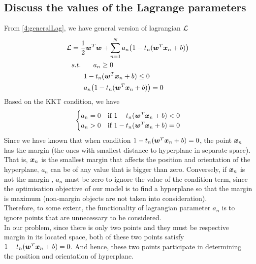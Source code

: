 \documentclass[11pt,a4paper]{article}
\newcommand{\htab}{\hspace*{0.63cm}}
\begin{document}
\subsection{Discuss the values of the Lagrange parameters}
\htab From \eqref{4:generalLag}, we have general version of lagrangian $\mathcal{L}$
\begin{align}
    \lagg &= \frac{1}{2} \wt \w + \sumn a_{n} \big( 1 - t_{n} (\wt \xn + b) \big) \nonumber\\
          & s.t.\htab  a_{n} \geq 0 \nonumber \\
          & \htab 1 - t_{n} (\wt \xn + b) \leq 0 \\
          & \htab a_{n} \big( \condition \big) = 0 \nonumber
    \end{align}
\htab Based on the KKT condition, we have 
\begin{align}
      \begin{cases} 
         a_{n} = 0 & \text{if }  1 - t_{n} (\boldsymbol{w}^{T} \boldsymbol{x}_{n} + b) < 0 \\
         a_{n} > 0 & \text{if }  1 - t_{n} (\boldsymbol{w}^{T} \boldsymbol{x}_{n} + b) = 0 
        \end{cases}
\end{align}
\htab Since we have known that when condition $1 - t_{n} (\boldsymbol{w}^{T} \boldsymbol{x}_{n} + b) = 0$, the point $\boldsymbol{x}_{n}$ has the margin (the ones 
with smallest distance to hyperplane in separate space).
That is, $\boldsymbol{x}_{n}$ is the smallest margin that affects the position and orientation of the hyperplane, 
$a_{n}$ can be of any value that is bigger than zero. Conversely, if $\boldsymbol{x}_{n}$ is not the margin 
, $a_{n}$ must be zero to ignore the value of the condition term, since the optimisation objective
of our model is to find a hyperplane so that the margin is maximum (non-margin objects are not taken 
into consideration). \\
\htab Therefore, to some extent, the functionality of lagrangian parameter $a_{n}$ is to ignore 
 points that are unnecessary to be considered. \\
 \htab In our problem, since there is only two points and they must be respective margin
 in its located space, both of these two points satisfy $1 - t_{n} (\boldsymbol{w}^{T} \boldsymbol{x}_{n} + b) = 0$. And hence, these two points
 participate in determining the position and orientation of hyperplane.
\newpage
\end{document}
